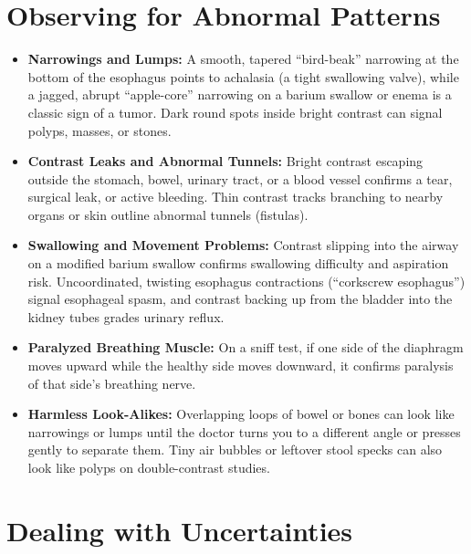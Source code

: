 \section{Observing for Abnormal Patterns}

\begin{itemize}
    \item \textbf{Narrowings and Lumps:} A smooth, tapered ``bird-beak'' narrowing at the bottom of the esophagus points to achalasia (a tight swallowing valve), while a jagged, abrupt ``apple-core'' narrowing on a barium swallow or enema is a classic sign of a tumor. Dark round spots inside bright contrast can signal polyps, masses, or stones.
    \item \textbf{Contrast Leaks and Abnormal Tunnels:} Bright contrast escaping outside the stomach, bowel, urinary tract, or a blood vessel confirms a tear, surgical leak, or active bleeding. Thin contrast tracks branching to nearby organs or skin outline abnormal tunnels (fistulas).
    \item \textbf{Swallowing and Movement Problems:} Contrast slipping into the airway on a modified barium swallow confirms swallowing difficulty and aspiration risk. Uncoordinated, twisting esophagus contractions (``corkscrew esophagus'') signal esophageal spasm, and contrast backing up from the bladder into the kidney tubes grades urinary reflux.
    \item \textbf{Paralyzed Breathing Muscle:} On a sniff test, if one side of the diaphragm moves upward while the healthy side moves downward, it confirms paralysis of that side's breathing nerve.
    \item \textbf{Harmless Look-Alikes:} Overlapping loops of bowel or bones can look like narrowings or lumps until the doctor turns you to a different angle or presses gently to separate them. Tiny air bubbles or leftover stool specks can also look like polyps on double-contrast studies.
\end{itemize}

\section{Dealing with Uncertainties}


